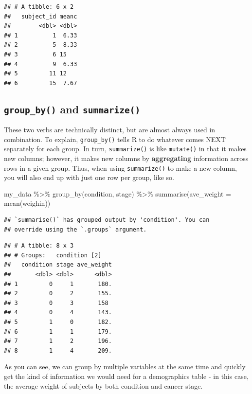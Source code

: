 \documentclass[
]{book}
\newenvironment{Shaded}{\begin{snugshade}}{\end{snugshade}}
\newcommand{\AttributeTok}[1]{\textcolor[rgb]{0.77,0.63,0.00}{#1}}
\newcommand{\FunctionTok}[1]{\textcolor[rgb]{0.00,0.00,0.00}{#1}}
\newcommand{\NormalTok}[1]{#1}
\newcommand{\SpecialCharTok}[1]{\textcolor[rgb]{0.00,0.00,0.00}{#1}}
\begin{document}
\begin{verbatim}
## # A tibble: 6 x 2
##   subject_id meanc
##        <dbl> <dbl>
## 1          1  6.33
## 2          5  8.33
## 3          6 15   
## 4          9  6.33
## 5         11 12   
## 6         15  7.67
\end{verbatim}

\hypertarget{group_by-and-summarize}{%
\subsection{\texorpdfstring{\texttt{group\_by()} and \texttt{summarize()}}{group\_by() and summarize()}}\label{group_by-and-summarize}}

These two verbs are technically distinct, but are almost always used in combination. To explain, \texttt{group\_by()} tells R to do whatever comes NEXT separately for each group. In turn, \texttt{summarize()} is like \texttt{mutate()} in that it makes new columns; however, it makes new columns by \textbf{aggregating} information across rows in a given group. Thus, when using \texttt{summarize()} to make a new column, you will also end up with just one row per group, like so.

\begin{Shaded}
\begin{Highlighting}[]
\NormalTok{my\_data }\SpecialCharTok{\%\textgreater{}\%} 
  \FunctionTok{group\_by}\NormalTok{(condition, stage) }\SpecialCharTok{\%\textgreater{}\%} 
  \FunctionTok{summarise}\NormalTok{(}\AttributeTok{ave\_weight =} \FunctionTok{mean}\NormalTok{(weighin))}
\end{Highlighting}
\end{Shaded}

\begin{verbatim}
## `summarise()` has grouped output by 'condition'. You can
## override using the `.groups` argument.
\end{verbatim}

\begin{verbatim}
## # A tibble: 8 x 3
## # Groups:   condition [2]
##   condition stage ave_weight
##       <dbl> <dbl>      <dbl>
## 1         0     1       180.
## 2         0     2       155.
## 3         0     3       158 
## 4         0     4       143.
## 5         1     0       182.
## 6         1     1       179.
## 7         1     2       196.
## 8         1     4       209.
\end{verbatim}

As you can see, we can group by multiple variables at the same time and quickly get the kind of information we would need for a demographics table - in this case, the average weight of subjects by both condition and cancer stage.
\end{document}
